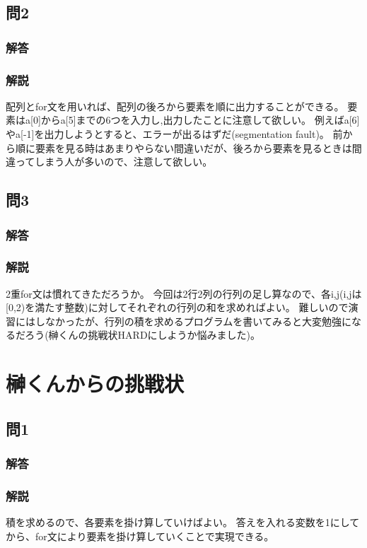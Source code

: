 
\subsection{問2}
\subsubsection{解答}

\subsubsection{解説}
配列とfor文を用いれば、配列の後ろから要素を順に出力することができる。
要素はa[0]からa[5]までの6つを入力し,出力したことに注意して欲しい。
例えばa[6]やa[-1]を出力しようとすると、エラーが出るはずだ(segmentation fault)。
前から順に要素を見る時はあまりやらない間違いだが、後ろから要素を見るときは間違ってしまう人が多いので、注意して欲しい。

\subsection{問3}
\subsubsection{解答}

\subsubsection{解説}
2重for文は慣れてきただろうか。
今回は2行2列の行列の足し算なので、各i,j(i,jは[0,2)を満たす整数)に対してそれぞれの行列の和を求めればよい。
難しいので演習にはしなかったが、行列の積を求めるプログラムを書いてみると大変勉強になるだろう(榊くんの挑戦状HARDにしようか悩みました)。

\section{榊くんからの挑戦状}
\subsection{問1}
\subsubsection{解答}

\subsubsection{解説}
積を求めるので、各要素を掛け算していけばよい。
答えを入れる変数を1にしてから、for文により要素を掛け算していくことで実現できる。


